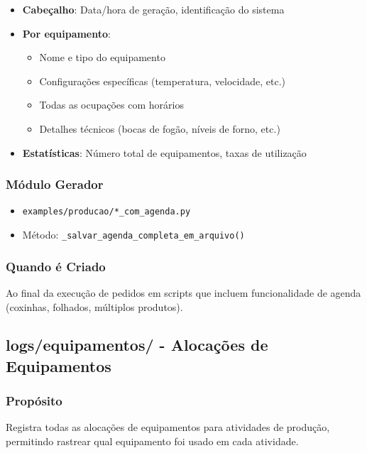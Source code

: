 \documentclass[11pt,a4paper]{article}
\begin{document}
\begin{itemize}[leftmargin=2cm]
    \item \textbf{Cabeçalho}: Data/hora de geração, identificação do sistema
    \item \textbf{Por equipamento}:
    \begin{itemize}
        \item Nome e tipo do equipamento
        \item Configurações específicas (temperatura, velocidade, etc.)
        \item Todas as ocupações com horários
        \item Detalhes técnicos (bocas de fogão, níveis de forno, etc.)
    \end{itemize}
    \item \textbf{Estatísticas}: Número total de equipamentos, taxas de utilização
\end{itemize}

\subsubsection{Módulo Gerador}

\begin{itemize}
    \item \texttt{examples/producao/*\_com\_agenda.py}
    \item Método: \texttt{\_salvar\_agenda\_completa\_em\_arquivo()}
\end{itemize}

\subsubsection{Quando é Criado}

Ao final da execução de pedidos em scripts que incluem funcionalidade de agenda (coxinhas, folhados, múltiplos produtos).

\subsection{logs/equipamentos/ - Alocações de Equipamentos}

\subsubsection{Propósito}

Registra todas as alocações de equipamentos para atividades de produção, permitindo rastrear qual equipamento foi usado em cada atividade.
\end{document}
